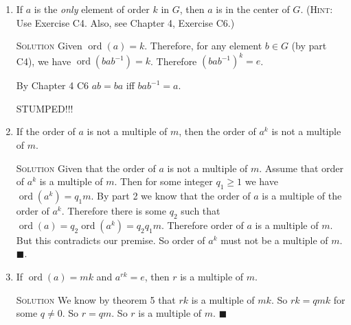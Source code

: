 \documentclass[twoside]{amsart}
\newcommand{\solution}{\textsc{Solution}\xspace}
\newcommand{\blank}{\vspace{5pt}}
\renewcommand{\qed}{\blacksquare}
\newcommand{\itm}{\blank\item}
\newcommand{\sol}{\blank\noindent\solution}
\newcommand{\ord}{\mathop{\mathrm{ord}}}
\begin{document}
\begin{enumerate}[A.]
\begin{enumerate}[1]
      \itm If $a$ is the \emph{only} element of order $k$ in $G$, then
      $a$ is in the center of $G$. (\textsc{Hint}: Use Exercise C4.
      Also, see Chapter 4, Exercise C6.)

      \sol Given $\ord(a)=k$. Therefore, for any element $b \in G$
      (by part C4), we have $\ord(bab^{-1}) = k$. Therefore $(bab^{-1})^k = e$.

      By Chapter 4 C6 $ab = ba$ iff $bab^{-1} = a$. 

      STUMPED!!!

      \itm If the order of $a$ is not a multiple of $m$, then
      the order of $a^k$ is not a multiple of $m$.

      \sol Given that the order of $a$ is not a multiple of $m$.
      Assume that order of $a^k$ is a multiple of $m$. Then
      for some integer $q_1 \geq 1$ we have $\ord(a^k) = q_1m$.
      By part 2 we know that the order of $a$ is a multiple of
      the order of $a^k$. Therefore there is some $q_2$ such
      that $\ord(a) = q_2 \ord(a^k) = q_2 q_1 m$. Therefore
      order of $a$ is a multiple of $m$. But this contradicts
      our premise. So order of $a^k$ must not be a multiple of $m$.$\qed$.

      \itm If $\ord(a) = mk$ and $a^{rk} = e$, then $r$ is a multiple of $m$.

      \sol We know by theorem 5 that $rk$ is a multiple of $mk$. 
      So $rk = qmk$ for some $q \ne 0$.  So $r = qm$. So $r$ is a multiple
      of $m$. $\qed$

   \end{enumerate}



\end{enumerate}
\end{document}
